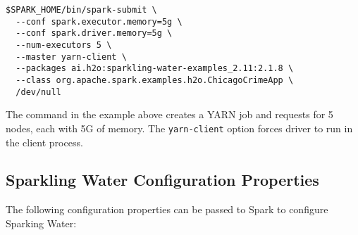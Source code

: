 \begin{lstlisting}[style=Bash]
$SPARK_HOME/bin/spark-submit \ 
  --conf spark.executor.memory=5g \
  --conf spark.driver.memory=5g \
  --num-executors 5 \
  --master yarn-client \
  --packages ai.h2o:sparkling-water-examples_2.11:2.1.8 \
  --class org.apache.spark.examples.h2o.ChicagoCrimeApp \
  /dev/null
\end{lstlisting}

The command in the example above creates a YARN job and requests for 5 nodes, each with 5G of memory. The \texttt{yarn-client} option forces driver to run in the client process.

\subsection{Sparkling Water Configuration Properties}

The following configuration properties can be passed to Spark to configure Sparking Water:

